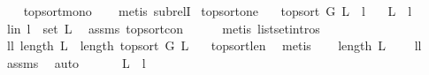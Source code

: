 \begin{isabellebody}
%
\isadelimproof
\ \ %
\endisadelimproof
%
\isatagproof
{}\isamarkupfalse%
\ top{\isacharunderscore}{\kern0pt}sort{\isacharunderscore}{\kern0pt}mono\isanewline
\ \ \isamarkupfalse%
\ {\isacharparenleft}{\kern0pt}metis\ subrelI{\isacharparenright}{\kern0pt}%
\endisatagproof
{\isafoldproof}%
%
\isadelimproof
\isanewline
%
\endisadelimproof
\isanewline
{}\isamarkupfalse%
\ top{\isacharunderscore}{\kern0pt}sort{\isacharunderscore}{\kern0pt}one{\isacharcolon}{\kern0pt}\isanewline
\ \ \ {\isachardoublequoteopen}top{\isacharunderscore}{\kern0pt}sort\ G\ L\ {\isacharequal}{\kern0pt}\ {\isacharbrackleft}{\kern0pt}l{\isacharbrackright}{\kern0pt}{\isachardoublequoteclose}\isanewline
\ \ \ {\isachardoublequoteopen}L\ {\isacharequal}{\kern0pt}\ {\isacharbrackleft}{\kern0pt}l{\isacharbrackright}{\kern0pt}{\isachardoublequoteclose}\isanewline
%
\isadelimproof
%
\endisadelimproof
%
\isatagproof
{}\isamarkupfalse%
\ {\isacharminus}{\kern0pt}\isanewline
\ \ \isamarkupfalse%
\ l{\isacharunderscore}{\kern0pt}in{\isacharcolon}{\kern0pt}\ {\isachardoublequoteopen}l\ {\isasymin}\ set\ L{\isachardoublequoteclose}\ \isamarkupfalse%
\ assms{\isacharparenleft}{\kern0pt}{}{\isacharparenright}{\kern0pt}\ top{\isacharunderscore}{\kern0pt}sort{\isacharunderscore}{\kern0pt}con\isanewline
\ \ \ \ \isamarkupfalse%
\ {\isacharparenleft}{\kern0pt}metis\ list{\isachardot}{\kern0pt}set{\isacharunderscore}{\kern0pt}intros{\isacharparenleft}{\kern0pt}{}{\isacharparenright}{\kern0pt}{\isacharparenright}{\kern0pt}\ \ \ \isanewline
\ \ \isamarkupfalse%
\ ll{\isacharcolon}{\kern0pt}\ {\isachardoublequoteopen}length\ L\ {\isacharequal}{\kern0pt}\ length\ {\isacharparenleft}{\kern0pt}top{\isacharunderscore}{\kern0pt}sort\ G\ L{\isacharparenright}{\kern0pt}\ {\isachardoublequoteclose}\ \isamarkupfalse%
\ top{\isacharunderscore}{\kern0pt}sort{\isacharunderscore}{\kern0pt}len\ \isamarkupfalse%
\ metis\isanewline
\ \ \isamarkupfalse%
\ {\isachardoublequoteopen}length\ L\ {\isacharequal}{\kern0pt}\ {}{\isachardoublequoteclose}\ \isamarkupfalse%
\ ll\ \isamarkupfalse%
\ assms\ \isamarkupfalse%
\ auto\ \isanewline
\ \ \isamarkupfalse%
\ \isamarkupfalse%
\ {\isachardoublequoteopen}L\ {\isacharequal}{\kern0pt}\ {\isacharbrackleft}{\kern0pt}l{\isacharbrackright}{\kern0pt}{\isachardoublequoteclose}\ \ \isamarkupfalse%

\end{isabellebody}
